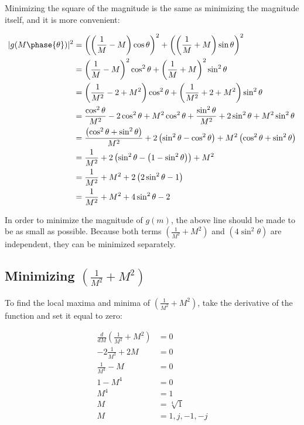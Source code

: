 \documentclass[11pt]{article}
\begin{document}
	Minimizing the square of the magnitude is the same as minimizing the magnitude itself, and it is more convenient:
	
	\begin{align}
		|g(M\phase{\theta})|^2 &= \left(\left(\frac{1}{M}-M\right)\cos{\theta}\right)^2+\left(\left(\frac{1}{M} + M\right)\sin{\theta}\right)^2 \nonumber\\
		&= \left(\frac{1}{M}-M\right)^2\cos^{2}{\theta} + \left(\frac{1}{M} + M\right)^2\sin^{2}{\theta} \nonumber\\
		&= \left(\frac{1}{M^2}-2+M^2\right)\cos^{2}{\theta} + \left(\frac{1}{M^2}+2+M^2\right)\sin^{2}{\theta} \nonumber\\
		&= \frac{\cos^{2}{\theta}}{M^2} - 2\cos^{2}{\theta} + M^2\cos^{2}{\theta} + \frac{\sin^{2}{\theta}}{M^2} + 2\sin^{2}{\theta} + M^2\sin^{2}{\theta} \nonumber\\
		&= \frac{\left(\cos^2{\theta} + \sin^2{\theta}\right)}{M^2} + 2\left(\sin^2{\theta} - \cos^2{\theta}\right) + M^2\left(\cos^2{\theta} + \sin^2{\theta}\right) \nonumber\\
		&= \frac{1}{M^2} + 2\left(\sin^2{\theta} - \left(1 - \sin^2{\theta}\right)\right) + M^2 \nonumber\\
		&= \frac{1}{M^2} + M^2 + 2\left(2\sin^2{\theta} - 1\right) \nonumber\\
		\label{eq:MinimizeMeCaptain}
		&= \frac{1}{M^2} + M^2 + 4\sin^2{\theta} - 2
	\end{align}
	
	In order to minimize the magnitude of $g(m)$, the above line should be made to be as small as possible. Because both terms $\left(\frac{1}{M^2} + M^2\right)$ and $\left(4\sin^2{\theta}\right)$ are independent, they can be minimized separately.
	
	
	
	\subsection{Minimizing $\left(\frac{1}{M^2} + M^2\right)$}
	
	To find the local maxima and minima of $\left(\frac{1}{M^2} + M^2\right)$, take the derivative of the function and set it equal to zero:
	
	\begin{align*}
		\frac{d}{dM}\left(\frac{1}{M^2} + M^2\right) &= 0 \\
		-2\frac{1}{M^3} + 2M &= 0 \\
		\frac{1}{M^3} - M &= 0 \\
		1 - M^4 &= 0 \\
		M^4 &= 1 \\
		M &= \sqrt[4]{1} \\
		M &= 1, j, -1, -j 
	\end{align*}
	
\end{document}

